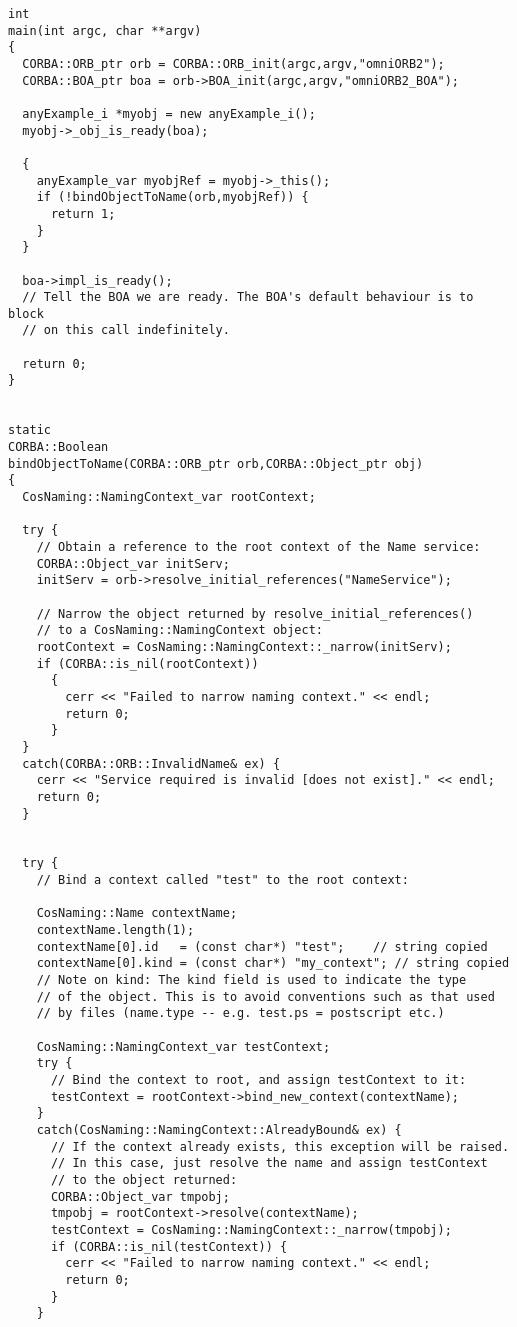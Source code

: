 \documentclass[11pt,twoside,onecolumn]{book}
\begin{document}
{\begin{verbatim}
int
main(int argc, char **argv)
{
  CORBA::ORB_ptr orb = CORBA::ORB_init(argc,argv,"omniORB2");
  CORBA::BOA_ptr boa = orb->BOA_init(argc,argv,"omniORB2_BOA");

  anyExample_i *myobj = new anyExample_i();
  myobj->_obj_is_ready(boa);

  {
    anyExample_var myobjRef = myobj->_this();
    if (!bindObjectToName(orb,myobjRef)) {
      return 1;
    }
  }

  boa->impl_is_ready();
  // Tell the BOA we are ready. The BOA's default behaviour is to block
  // on this call indefinitely.

  return 0;
}


static
CORBA::Boolean
bindObjectToName(CORBA::ORB_ptr orb,CORBA::Object_ptr obj)
{
  CosNaming::NamingContext_var rootContext;
  
  try {
    // Obtain a reference to the root context of the Name service:
    CORBA::Object_var initServ;
    initServ = orb->resolve_initial_references("NameService");

    // Narrow the object returned by resolve_initial_references()
    // to a CosNaming::NamingContext object:
    rootContext = CosNaming::NamingContext::_narrow(initServ);
    if (CORBA::is_nil(rootContext)) 
      {
        cerr << "Failed to narrow naming context." << endl;
        return 0;
      }
  }
  catch(CORBA::ORB::InvalidName& ex) {
    cerr << "Service required is invalid [does not exist]." << endl;
    return 0;
  }


  try {
    // Bind a context called "test" to the root context:

    CosNaming::Name contextName;
    contextName.length(1);
    contextName[0].id   = (const char*) "test";    // string copied
    contextName[0].kind = (const char*) "my_context"; // string copied    
    // Note on kind: The kind field is used to indicate the type
    // of the object. This is to avoid conventions such as that used
    // by files (name.type -- e.g. test.ps = postscript etc.)

    CosNaming::NamingContext_var testContext;
    try {
      // Bind the context to root, and assign testContext to it:
      testContext = rootContext->bind_new_context(contextName);
    }
    catch(CosNaming::NamingContext::AlreadyBound& ex) {
      // If the context already exists, this exception will be raised.
      // In this case, just resolve the name and assign testContext
      // to the object returned:
      CORBA::Object_var tmpobj;
      tmpobj = rootContext->resolve(contextName);
      testContext = CosNaming::NamingContext::_narrow(tmpobj);
      if (CORBA::is_nil(testContext)) {
        cerr << "Failed to narrow naming context." << endl;
        return 0;
      }
    } 


\end{verbatim}}
\end{document}
